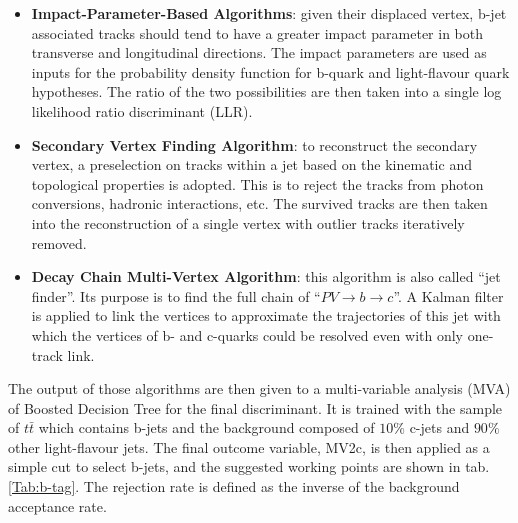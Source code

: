 \begin{itemize}
	\item {\bf Impact-Parameter-Based Algorithms}: given their displaced vertex, b-jet associated tracks should tend to have a greater impact parameter in both transverse and longitudinal directions. The impact parameters are used as inputs for the probability density function for b-quark and light-flavour quark hypotheses. The ratio of the two possibilities are then taken into a single log likelihood ratio discriminant (LLR).
	\item {\bf Secondary Vertex Finding Algorithm}: to reconstruct the secondary vertex, a preselection on tracks within a jet based on the kinematic and topological properties is adopted. This is to reject the tracks from photon conversions, hadronic interactions, etc. The survived tracks are then taken into the reconstruction of a single vertex with outlier tracks iteratively removed. 
	\item {\bf Decay Chain Multi-Vertex Algorithm}: this algorithm is also called ``jet finder''. Its purpose is to find the full chain of ``$PV \rightarrow b \rightarrow c$''. A Kalman filter is applied to link the vertices to approximate the trajectories of this jet with which the vertices of b- and c-quarks could be resolved even with only one-track link.  
\end{itemize}
\noindent
The output of those algorithms are then given to a multi-variable analysis (MVA) of Boosted Decision Tree for the final discriminant. It is trained with the sample of $t\bar{t}$ which contains b-jets and the background composed of $10\%$ c-jets and $90\%$ other light-flavour jets. The final outcome variable, MV2c, is then applied as a simple cut to select b-jets, and the suggested working points are shown in tab. \ref{Tab:b-tag}. The rejection rate is defined as the inverse of the background acceptance rate. 

